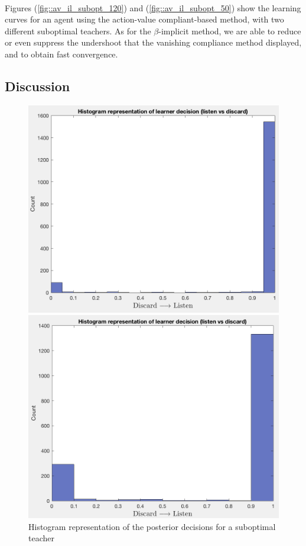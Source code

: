 \documentclass[a4paper]{report}
\begin{document}
{{{{				\paragraph{} Figures (\ref{fig::av_il_subopt_120}) and (\ref{fig::av_il_subopt_50}) show the learning curves for an agent using the action-value compliant-based method, with two different suboptimal teachers. As for the $\beta$-implicit method, we are able to reduce or even suppress the undershoot that the vanishing compliance method displayed, and to obtain fast convergence. 				
			}
			\subsection{Discussion}
			{		
				\begin{figure}[ht!]
					\begin{minipage}{0.45\linewidth}
						\begin{center}
							\includegraphics[width=0.9\linewidth]{pos_des_120}
							\caption{Histogram representation of the posterior decisions for a suboptimal teacher}
							\label{fig::post_des_120}
						\end{center}
					\end{minipage}
					\hfill
					\begin{minipage}{0.45\linewidth}
						\begin{center}
							\includegraphics[width=0.9\linewidth]{pos_des_50}

\end{center}
\end{minipage}
\end{figure}}}}}
\end{document}
